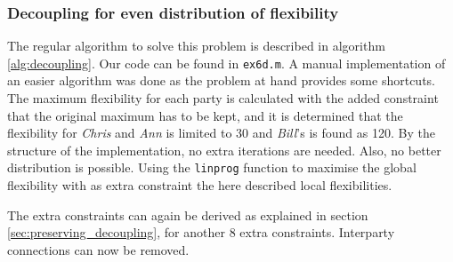 \documentclass[10pt,a4paper]{article}
\begin{document}
\subsubsection{Decoupling for even distribution of flexibility}
The regular algorithm to solve this problem is described in algorithm \ref{alg:decoupling}. Our code can be found in \texttt{ex6d.m}. A manual implementation of an easier algorithm was done as the problem at hand provides some shortcuts. The maximum flexibility for each party is calculated with the added constraint that the original maximum has to be kept, and it is determined that the flexibility for \emph{Chris} and \emph{Ann} is limited to 30 and \emph{Bill}'s is found as 120. By the structure of the implementation, no extra iterations are needed. Also, no better distribution is possible. Using the \texttt{linprog} function to maximise the global flexibility with as extra constraint the here described local flexibilities.

The extra constraints can again be derived as explained in section \ref{sec:preserving_decoupling}, for another 8 extra constraints. Interparty connections can now be removed. \\

\noindent{}
 
\end{document}

